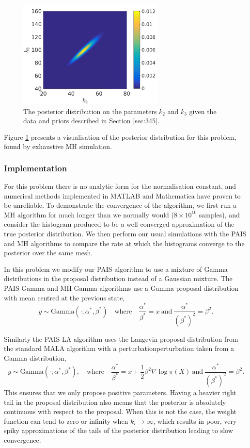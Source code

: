 \documentclass[final]{siamltex}
\begin{document}
\begin{figure}[htb]
\centering
\includegraphics[width=0.65\textwidth]{"figures/C1_posterior"}
\caption{The posterior distribution on the parameters $k_2$ and $k_3$
  given the data and priors described in Section \ref{sec:345}.}
\label{fig:345}
\end{figure}

Figure \ref{fig:345} presents a visualisation of the posterior
distribution for this problem, found by exhaustive MH simulation.

\subsubsection{Implementation}\label{sec:chem_implementation}
For this problem there is no analytic form for the normalisation
constant, and numerical methods implemented in MATLAB and Mathematica
have proven to be unreliable. To demonstrate the convergence of the
algorithm, we first run a MH algorithm for much longer than we
normally would ($8\times 10^{10}$ samples), and consider the histogram
produced to be a well-converged approximation of the true posterior
distribution. We then perform our usual simulations with the PAIS and
MH algorithms to compare the rate at which the histograms converge to
the posterior over the same mesh.

In this problem we modify our PAIS algorithm to use a mixture of Gamma
distributions in the proposal distribution instead of a Gaussian
mixture. The PAIS-Gamma and MH-Gamma algorithms use a Gamma
proposal distribution with mean centred at the previous state,
\[
	y \sim \text{Gamma}(\cdot;\alpha^*, \beta^*) \quad \text{where} \quad \frac{\alpha^*}{\beta^*} = x \ \text{and} \ \frac{\alpha^*}{(\beta^*)^2} = \beta^2.
\]

Similarly the PAIS-LA algorithm uses the Langevin proposal distribution
from the standard MALA algorithm with a perturbationperturbation taken from a Gamma
distribution,
\[
	y \sim \text{Gamma}(\cdot; \alpha^*, \beta^*), \quad \text{where} \quad \frac{\alpha^*}{\beta^*} = x+\frac{1}{2}\beta^2\nabla\log\pi(X) \ \text{and} \ \frac{\alpha^*}{(\beta^*)^2} = \beta^2.
\]
This ensures that we only propose positive
parameters. Having a heavier right tail in the proposal distribution
also means that the posterior is absolutely continuous with respect to
the proposal. When this is not the case, the weight function can tend
to zero or infinity when $k_i \rightarrow \infty$, which results in
poor, very spiky approximations of the tails of the posterior distribution leading to slow convergence.
\end{document}
